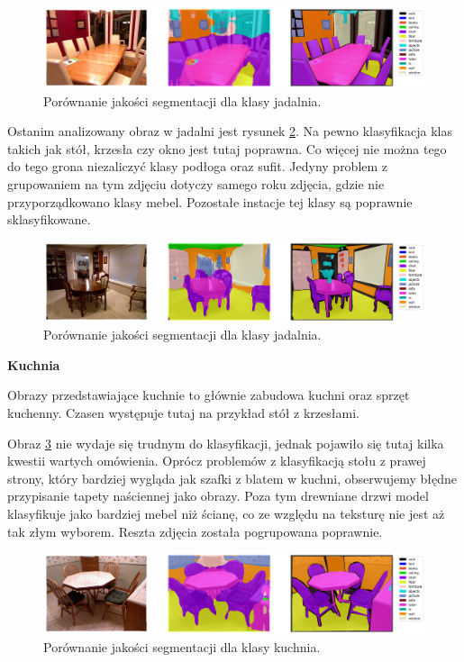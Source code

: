 \begin{figure}[ht!]
    \centering
    \includegraphics[width=\textwidth]{img/preds_analysis/gt_vs_pred/dining_room-2.png}
    \caption{Porównanie jakości segmentacji dla klasy jadalnia.}
    \label{fig:dining_room-pred-2}
\end{figure}

Ostanim analizowany obraz w jadalni jest rysunek \ref{fig:dining_room-pred-3}. Na pewno klasyfikacja klas takich jak stół, krzesła czy okno jest tutaj poprawna. Co więcej nie można tego do tego grona niezaliczyć klasy podłoga oraz sufit. Jedyny problem z grupowaniem na tym zdjęciu dotyczy samego roku zdjęcia, gdzie nie przyporządkowano klasy mebel. Pozostałe instacje tej klasy są poprawnie sklasyfikowane.

\begin{figure}[ht!]
    \centering
    \includegraphics[width=\textwidth]{img/preds_analysis/gt_vs_pred/dining_room-3.png}
    \caption{Porównanie jakości segmentacji dla klasy jadalnia.}
    \label{fig:dining_room-pred-3}
\end{figure}

\noindent
\textbf{Kuchnia}

Obrazy przedstawiające kuchnie to głównie zabudowa kuchni oraz sprzęt kuchenny. Czasen występuje tutaj na przykład stół z krzesłami.

Obraz \ref{fig:kitchen-pred-1} nie wydaje się trudnym do klasyfikacji, jednak pojawiło się tutaj kilka kwestii wartych omówienia. Oprócz problemów z klasyfikacją stołu z prawej strony, który bardziej wygląda jak szafki z blatem w kuchni, obserwujemy błędne przypisanie tapety naściennej jako obrazy. Poza tym drewniane drzwi model klasyfikuje jako bardziej mebel niż ścianę, co ze względu na teksturę nie jest aż tak złym wyborem. Reszta zdjęcia została pogrupowana poprawnie.

\begin{figure}[ht!]
    \centering
    \includegraphics[width=\textwidth]{img/preds_analysis/gt_vs_pred/kitchen-1.png}
    \caption{Porównanie jakości segmentacji dla klasy kuchnia.}
    \label{fig:kitchen-pred-1}
\end{figure}

